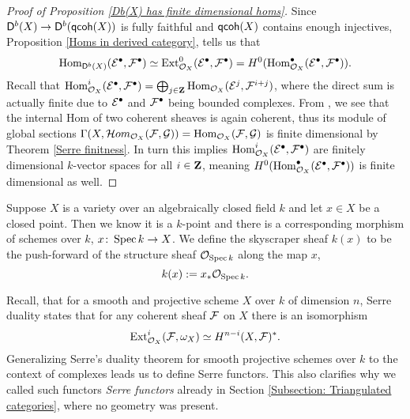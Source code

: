 
\begin{proof}[Proof of Proposition \ref{Db(X) has finite dimensional homs}]
    Since $\mathsf{D}^b(X) \to \mathsf{D}^b(\mathsf{qcoh}(X))$ is fully faithful and $\mathsf{qcoh}(X)$ contains enough injectives, Proposition \ref{Homs in derived category}, tells us that
    \[
        \operatorname{Hom}_{\mathsf{D}^b(X)}(\mathcal E^\bullet, \mathcal F^\bullet) \simeq \operatorname{Ext}^0_{{\mathcal{O}_{X}}}(\mathcal E^\bullet, \mathcal F^\bullet) = H^0(\operatorname{Hom}^\bullet_{{\mathcal{O}_{X}}}(\mathcal E^\bullet, \mathcal F^\bullet)).
    \]
    Recall that $\operatorname{Hom}^i_{{\mathcal{O}_{X}}}(\mathcal E^\bullet, \mathcal F^\bullet) = \bigoplus_{j \in \mathbf Z} \operatorname{Hom}_{{\mathcal{O}_{X}}}(\mathcal E^j, \mathcal F^{i+j})$, where the direct sum is actually finite due to $\mathcal E^\bullet$ and $\mathcal F^\bullet$ being bounded complexes. From \cite[\href{https://stacks.math.columbia.edu/tag/01CQ}{Tag 01CQ}]{stacks-project}, we see that the internal Hom of two coherent sheaves is again coherent, thus its module of global sections $\Gamma(X, \localhom_{\struct{X}}(\F, \G)) = \Hom_{\struct{X}}(\F, \G)$ is finite dimensional by Theorem \ref{Serre finitness}. In turn this implies $\operatorname{Hom}^i_{{\mathcal{O}_{X}}}(\mathcal E^\bullet, \mathcal F^\bullet)$ are finitely dimensional $k$-vector spaces for all $i \in \mathbf Z$, meaning $H^0(\operatorname{Hom}^\bullet_{{\mathcal{O}_{X}}}(\mathcal E^\bullet, \mathcal F^\bullet))$ is finite dimensional as well. 
\end{proof}


Suppose $X$ is a variety over an algebraically closed field $k$ and let $x \in X$ be a closed point. Then we know it is a $k$-point and there is a corresponding morphism of schemes over $k$, $x \colon \operatorname{Spec}k \to X$. We define the skyscraper sheaf $k(x)$ to be the push-forward of the structure sheaf ${\mathcal{O}_{\operatorname{Spec}k}}$ along the map $x$, 
\[
    k(x) := x_* {\mathcal{O}_{\operatorname{Spec}k}}.
\]

Recall, that for a smooth and projective scheme $X$ over $k$ of dimension $n$, Serre duality \cite[\S III, Theorem 7.6]{Hartshorne1977} states that for any coherent sheaf $\mathcal F$ on $X$ there is an isomorphism
\[
    \operatorname{Ext}_{{\mathcal{O}_{X}}}^i(\mathcal F, \omega_X) \simeq H^{n-i}(X, \mathcal F)^*.
\]
Generalizing Serre's duality theorem for smooth projective schemes over $k$ to the context of complexes leads us to define Serre functors. This also clarifies why we called such functors \emph{Serre functors} already in Section \ref{Subsection: Triangulated categories}, where no geometry was present. 

